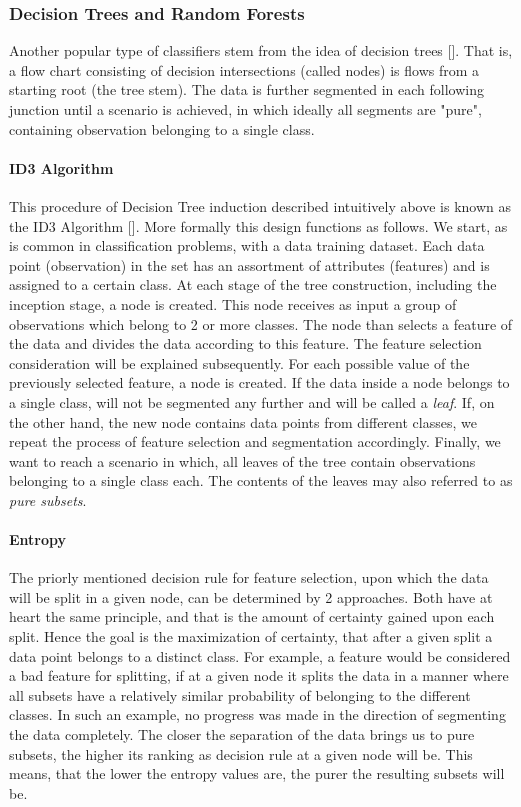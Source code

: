 \subsubsection{Decision Trees and Random Forests}
	Another popular type of classifiers stem from the idea of decision trees [\cite{quinlan2014c4}]. That is, a flow chart consisting of decision intersections (called nodes) is flows from a starting root (the tree stem). The data is further segmented in each following junction until  a scenario is achieved, in which ideally all segments are "pure", containing observation belonging to a single class. 
		
	\paragraph{ID3 Algorithm} 
		This procedure of Decision Tree induction described intuitively above is known as the ID3 Algorithm [\cite{quinlan1986induction}]. More formally this design functions as follows. We start, as is common in classification problems, with a data training dataset. Each data point (observation) in the set has an assortment of attributes (features) and is assigned to a certain class. At each stage of the tree construction, including the inception stage, a node is created. This node receives as input a group of observations which belong to 2 or more classes. The node than selects a feature of the data and divides the data according to this feature. The feature selection consideration will be explained subsequently. For each possible value of the previously selected feature, a node is created. If the data inside a node belongs to a single class, will not be segmented any further and will be called a \textit{leaf}. If, on the other hand, the new node contains data points from different classes, we repeat the process of feature selection and segmentation accordingly. Finally, we want to reach a scenario in which, all leaves of the tree contain observations belonging to a single class each. The contents of the leaves may also referred to as \textit{pure subsets}.
		
		\paragraph{Entropy}
		The priorly mentioned decision rule for feature selection, upon which the data will be split in a given node, can be determined by 2 approaches. Both have at heart the same principle, and that is the amount of certainty gained upon each split. Hence the goal is the maximization of certainty, that after a given split a data point belongs to a distinct class. For example, a feature would be considered a bad feature for splitting, if at a given node it splits the data in a manner where all subsets have a relatively similar probability of belonging to the different classes. In such an example, no progress was made in the direction of segmenting the data completely. The closer the separation of the data brings us to pure subsets, the higher its ranking as decision rule at a given node will be. This means, that the lower the entropy values are, the purer the resulting subsets will be.
		
